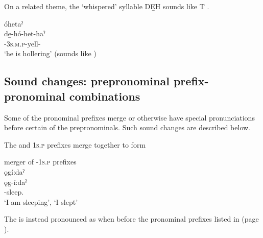 On a related theme, the ‘whispered’ syllable DE̱H sounds like T .

\ea\label{ex:hinitialex2}
óhetaˀ\\
\gll de̱-hó-het-haˀ\\
{\dualic}-\textsc{3s.m.p}-yell-{\habitual}\\
\glt ‘he is hollering’ (sounds like )
\z

\subsection{Sound changes: prepronominal prefix-pronominal combinations} \label{Sound changes - prepronominal prefix-pronominal combinations}
Some of the pronominal prefixes merge or otherwise have special pronunciations before certain of the prepronominals. Such sound changes are described below.

The  \textsc{\factual} and  \textsc{1s.p} prefixes merge together to form  

\ea\label{ex:pronominalprefixpronunex8} merger of  \textsc{\factual-1s.p} prefixes\\
ǫgí:daˀ \\
\gll ǫg-í:daˀ\\
 -sleep.{\punctual}\\
\glt ‘I am sleeping’, `I slept'
\z


The  \textsc{\factual} is instead pronounced as  when before the pronominal prefixes listed in  (page \pageref{figtab:1:efact}).


